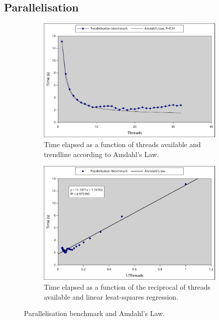 \subsection{Parallelisation}
\label{ssub:parallelisation}

\begin{figure}
   \centering
   \begin{subfigure}[b]{0.4\textwidth}
   \centering
   \includegraphics[width=\linewidth]{figures/parallel1.pdf}
       \caption{Time elapsed as a function of threads available and trendline according to Amdahl's Law.}
   \label{fig:parallel1}
   \end{subfigure}\quad\begin{subfigure}[b]{0.4\textwidth}
   \centering
   \includegraphics[width=\linewidth]{figures/parallel2.pdf}
       \caption{Time elapsed as a function of the reciprocal of threads available and linear lesat-squares regression.}
   \label{fig:parallel2}
   \end{subfigure}
   \caption{Parallelisation benchmark and Amdahl's Law.}
\end{figure}

